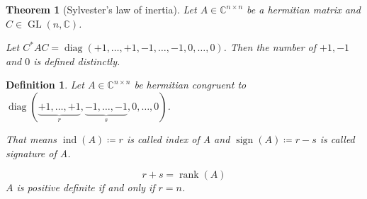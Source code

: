 \documentclass[a4paper,landscape,twocolumn]{article}
\newtheorem{theorem}{Theorem}
\newtheorem{defi}{Definition}
\begin{document}
\begin{theorem}[Sylvester's law of inertia]
  Let $A \in \mathbb C^{n\times n}$ be a hermitian matrix and $C \in \operatorname{GL}(n, \mathbb C)$.

  Let $C^* AC = \operatorname{diag}(+1, \ldots, +1, -1, \ldots, -1, 0, \ldots, 0)$.
  Then the number of $+1, -1$ and $0$ is defined distinctly.
\end{theorem}

\begin{defi}
  \label{defi-8.28}
  Let $A \in \mathbb C^{n \times n}$ be hermitian
  congruent to $\operatorname{diag}(\underbrace{+1, \ldots, +1}_{r}, \underbrace{-1, \ldots, -1}_{s}, 0, \ldots, 0)$.

  That means $\operatorname{ind}(A) \coloneqq r$ is called \emph{index of A}
  and $\operatorname{sign}(A) \coloneqq r - s$ is called \emph{signature of A}.

  \[ r + s = \operatorname{rank}(A) \]
  $A$ is positive definite if and only if $r = n$.
\end{defi}

\clearpage
\begin{otherlanguage}{ngerman}
\printindex[German]
\end{otherlanguage}
\printindex[English]
\end{document}

